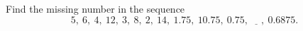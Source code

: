Find the missing number in the sequence
\[
5,\ 6,\ 4,\ 12,\ 3,\ 8,\ 2,\ 14,\ 1.75,\ 10.75,\ 0.75,\ \underline{\quad},\ 0.6875 .
\]
